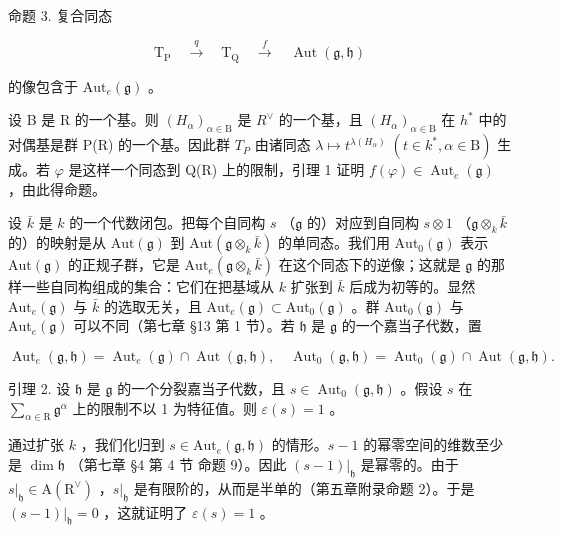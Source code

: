 命题 3. 复合同态

\[
\mathrm{T} _ {\mathrm{P}} \quad \xrightarrow {q} \quad \mathrm{T} _ {\mathrm{Q}} \quad \xrightarrow {f} \quad \operatorname{Aut} (\mathfrak {g}, \mathfrak {h})
\]

的像包含于 \(\mathrm{Aut}_e(\mathfrak{g})\) 。

设 B 是 R 的一个基。则 \((H_{\alpha})_{\alpha\in\mathrm{B}}\) 是 \(R^{\vee}\) 的一个基，且 \((H_{\alpha})_{\alpha\in\mathrm{B}}\) 在 \(h^{*}\) 中的对偶基是群 P(R) 的一个基。因此群 \(T_{P}\) 由诸同态 \(\lambda\mapsto t^{\lambda(H_{\alpha})}\;(t\in k^{*},\alpha\in\mathrm{B})\) 生成。若 \(\varphi\) 是这样一个同态到 Q(R) 上的限制，引理 1 证明 \(f(\varphi)\in\operatorname{Aut}_{e}(\mathfrak{g})\) ，由此得命题。

设 \(\bar{k}\) 是 \(k\) 的一个代数闭包。把每个自同构 \(s\) （\(\mathfrak{g}\) 的）对应到自同构 \(s \otimes 1\) （\(\mathfrak{g} \otimes_k \bar{k}\) 的）的映射是从 \(\mathrm{Aut}(\mathfrak{g})\) 到 \(\mathrm{Aut}(\mathfrak{g} \otimes_k \bar{k})\) 的单同态。我们用 \(\mathrm{Aut}_0(\mathfrak{g})\) 表示 \(\mathrm{Aut}(\mathfrak{g})\) 的正规子群，它是 \(\mathrm{Aut}_e(\mathfrak{g} \otimes_k \bar{k})\) 在这个同态下的逆像；这就是 \(\mathfrak{g}\) 的那样一些自同构组成的集合：它们在把基域从 \(k\) 扩张到 \(\bar{k}\) 后成为初等的。显然 \(\mathrm{Aut}_e(\mathfrak{g})\) 与 \(\bar{k}\) 的选取无关，且 \(\mathrm{Aut}_e(\mathfrak{g}) \subset \mathrm{Aut}_0(\mathfrak{g})\) 。群 \(\mathrm{Aut}_0(\mathfrak{g})\) 与 \(\mathrm{Aut}_e(\mathfrak{g})\) 可以不同（第七章 §13 第 1 节）。若 \(\mathfrak{h}\) 是 \(\mathfrak{g}\) 的一个嘉当子代数，置

\[
\operatorname{Aut} _ {e} (\mathfrak {g}, \mathfrak {h}) = \operatorname{Aut} _ {e} (\mathfrak {g}) \cap \operatorname{Aut} (\mathfrak {g}, \mathfrak {h}), \quad \operatorname{Aut} _ {0} (\mathfrak {g}, \mathfrak {h}) = \operatorname{Aut} _ {0} (\mathfrak {g}) \cap \operatorname{Aut} (\mathfrak {g}, \mathfrak {h}).
\]

引理 2. 设 \(\mathfrak{h}\) 是 \(\mathfrak{g}\) 的一个分裂嘉当子代数，且 \(s \in \operatorname{Aut}_0(\mathfrak{g}, \mathfrak{h})\) 。假设 \(s\) 在 \(\sum_{\alpha \in \mathrm{R}} \mathfrak{g}^\alpha\) 上的限制不以 1 为特征值。则 \(\varepsilon(s) = 1\) 。

通过扩张 \(k\) ，我们化归到 \(s \in \mathrm{Aut}_e(\mathfrak{g}, \mathfrak{h})\) 的情形。\(s - 1\) 的幂零空间的维数至少是 \(\dim \mathfrak{h}\) （第七章 §4 第 4 节 命题 9）。因此 \((s - 1)|_{\mathfrak{h}}\) 是幂零的。由于 \(s|_{\mathfrak{h}} \in \mathrm{A}(\mathrm{R}^\vee)\) ，\(s|_{\mathfrak{h}}\) 是有限阶的，从而是半单的（第五章附录命题 2）。于是 \((s - 1)|_{\mathfrak{h}} = 0\) ，这就证明了 \(\varepsilon(s) = 1\) 。

